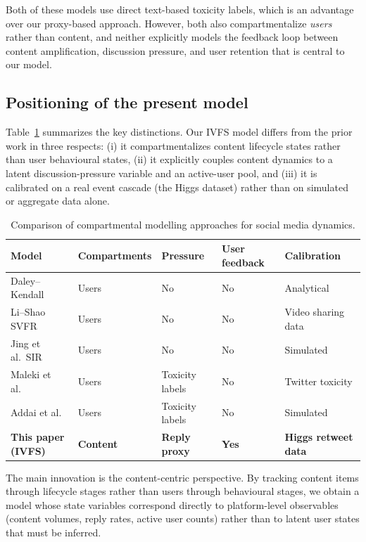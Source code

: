 \documentclass[11pt]{article}
\begin{document}
Both of these models use direct text-based toxicity labels, which is an advantage over our proxy-based approach. However, both also compartmentalize \emph{users} rather than content, and neither explicitly models the feedback loop between content amplification, discussion pressure, and user retention that is central to our model.

\subsection{Positioning of the present model}

Table~\ref{tab:lit} summarizes the key distinctions. Our IVFS model differs from the prior work in three respects: (i) it compartmentalizes content lifecycle states rather than user behavioural states, (ii) it explicitly couples content dynamics to a latent discussion-pressure variable and an active-user pool, and (iii) it is calibrated on a real event cascade (the Higgs dataset) rather than on simulated or aggregate data alone.

\begin{table}[H]
\centering
\caption{Comparison of compartmental modelling approaches for social media dynamics.}
\label{tab:lit}
\begin{tabular}{p{3.2cm} p{2.2cm} p{2cm} p{2.4cm} p{3.2cm}}
\toprule
Model & Compartments & Pressure & User feedback & Calibration \\
\midrule
Daley--Kendall \cite{daleyKendall1964} & Users & No & No & Analytical \\
Li--Shao SVFR \cite{liShao2024} & Users & No & No & Video sharing data \\
Jing et al.\ SIR \cite{jing2018} & Users & No & No & Simulated \\
Maleki et al.\ \cite{maleki2022} & Users & Toxicity labels & No & Twitter toxicity \\
Addai et al.\ \cite{addai2025} & Users & Toxicity labels & No & Simulated \\
\textbf{This paper (IVFS)} & \textbf{Content} & \textbf{Reply proxy} & \textbf{Yes} & \textbf{Higgs retweet data} \\
\bottomrule
\end{tabular}
\end{table}

The main innovation is the content-centric perspective. By tracking content items through lifecycle stages rather than users through behavioural stages, we obtain a model whose state variables correspond directly to platform-level observables (content volumes, reply rates, active user counts) rather than to latent user states that must be inferred.
\end{document}
